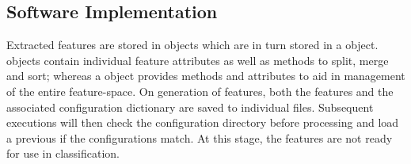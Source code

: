     \subsection{Software Implementation}
    \label{subsec:pl-feats-software}
        Extracted features are stored in  objects which are in turn stored in a  object.  objects contain individual feature attributes as well as methods to split, merge and sort; whereas a  object provides methods and attributes to aid in management of the entire feature-space. On generation of features, both the features and the associated configuration dictionary are saved to individual files. Subsequent executions will then check the configuration directory before processing and load a previous  if the configurations match. At this stage, the features are not ready for use in classification.  
        
  